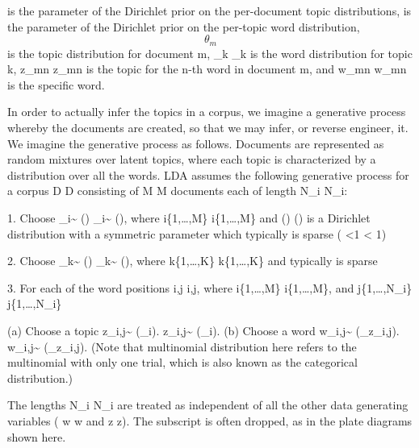 \alpha is the parameter of the Dirichlet prior on the per-document topic distributions,
\beta is the parameter of the Dirichlet prior on the per-topic word distribution,
\[{\theta_{m}}\] is the topic distribution for document m,
{\displaystyle \varphi _{k}} \varphi _{k} is the word distribution for topic k,
{\displaystyle z_{mn}} {\displaystyle z_{mn}} is the topic for the n-th word in document m, and
{\displaystyle w_{mn}} {\displaystyle w_{mn}} is the specific word.


In order to actually infer the topics in a corpus, we imagine a generative process whereby the documents are created, so that we may infer, or reverse engineer, it. We imagine the generative process as follows. Documents are represented as random mixtures over latent topics, where each topic is characterized by a distribution over all the words. LDA assumes the following generative process for a corpus {\displaystyle D} D consisting of {\displaystyle M} M documents each of length {\displaystyle N_{i}} N_{i}:

1. Choose {\displaystyle \theta _{i}\sim {} (\alpha )} {\displaystyle \theta _{i}\sim {} (\alpha )}, where {\displaystyle i\in \{1,\dots ,M\}} i\in \{1,\dots ,M\} and {\displaystyle {} (\alpha )}  (\alpha ) is a Dirichlet distribution with a symmetric parameter {\displaystyle \alpha } \alpha  which typically is sparse ( {\displaystyle \alpha <1} \alpha < 1)

2. Choose {\displaystyle \varphi _{k}\sim {} (\beta )} {\displaystyle \varphi _{k}\sim {} (\beta )}, where {\displaystyle k\in \{1,\dots ,K\}} k\in \{1,\dots ,K\} and {\displaystyle \beta } \beta  typically is sparse

3. For each of the word positions {\displaystyle i,j} i,j, where {\displaystyle i\in \{1,\dots ,M\}} i\in \{1,\dots ,M\}, and {\displaystyle j\in \{1,\dots ,N_{i}\}} j\in \{1,\dots ,N_{i}\}

(a) Choose a topic {\displaystyle z_{i,j}\sim {} (\theta _{i}).} {\displaystyle z_{i,j}\sim {} (\theta _{i}).}
(b) Choose a word {\displaystyle w_{i,j}\sim {} (\varphi _{z_{i,j}}).} {\displaystyle w_{i,j}\sim {} (\varphi _{z_{i,j}}).}
(Note that multinomial distribution here refers to the multinomial with only one trial, which is also known as the categorical distribution.)

The lengths {\displaystyle N_{i}} N_{i} are treated as independent of all the other data generating variables ( {\displaystyle w} w and {\displaystyle z} z). The subscript is often dropped, as in the plate diagrams shown here.






